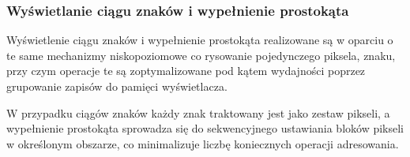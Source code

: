 \subsubsection{Wyświetlanie ciągu znaków i wypełnienie prostokąta}

Wyświetlenie ciągu znaków i wypełnienie prostokąta realizowane są w oparciu o te same mechanizmy niskopoziomowe co rysowanie pojedynczego piksela, znaku, przy czym operacje te są zoptymalizowane pod kątem wydajności poprzez grupowanie zapisów do pamięci wyświetlacza.

W przypadku ciągów znaków każdy znak traktowany jest jako zestaw pikseli, a wypełnienie prostokąta sprowadza się do sekwencyjnego ustawiania bloków pikseli w określonym obszarze, co minimalizuje liczbę koniecznych operacji adresowania.

